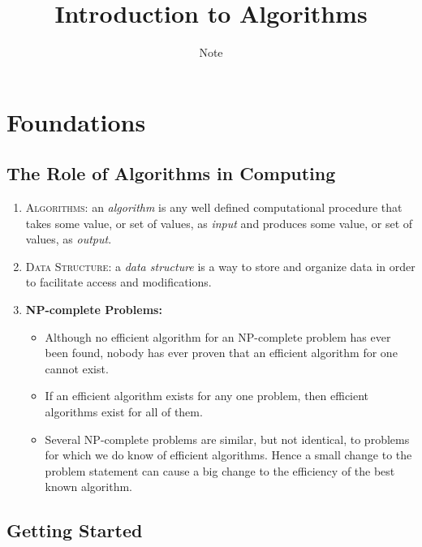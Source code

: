 \documentclass{report}
\title{Introduction to Algorithms}
\author{Note}
\begin{document}
\maketitle
\tableofcontents


\part{Foundations}
\chapter{The Role of Algorithms in Computing}
\begin{enumerate}[leftmargin=*]
    \item \textsc{Algorithms:} an \emph{algorithm} is any well defined computational procedure that takes some value, or set of values, as \emph{input} and produces some value, or set of values, as \emph{output}. 
    \item \textsc{Data Structure:} a \emph{data structure} is a way to store and organize data in order to facilitate access and modifications. 
    \item \textbf{NP-complete Problems:}
    \begin{itemize}
        \item Although no efficient algorithm for an NP-complete problem has ever been found, nobody has ever proven that an efficient algorithm for one cannot exist. 
        \item If an efficient algorithm exists for any one problem, then efficient algorithms exist for all of them. 
        \item Several NP-complete problems are similar, but not identical, to problems for which we do know of efficient algorithms. Hence a small change to the problem statement can cause a big change to the efficiency of the best known algorithm.
    \end{itemize}
\end{enumerate}

\chapter{Getting Started}
\end{document}
